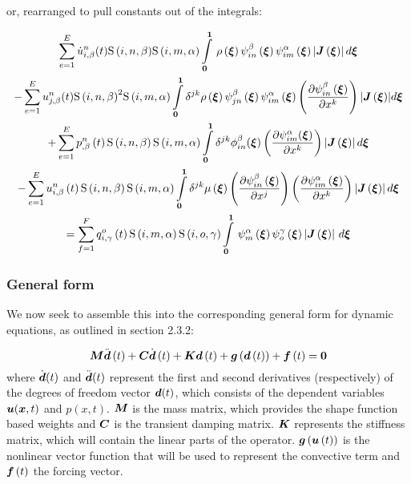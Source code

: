 or, rearranged to pull constants out of the integrals:

\begin{multline}
 \label{NSEFEM4}
  \dsum_{e=1}^{E}{\idxnodedof{\dot{u}}{i}{n}{\beta}}(t){\idxgsf{i}{n}{\beta}}{\idxgsf{i}{m}{\alpha}}
  \gint{\vectr{0}}{\vectr{1}}{\fnof{\rho}{\vectr{\xi}}{\idxgbfn{i}{n}{\beta}{\vectr{\xi}}\idxgbfn{i}{m}{\alpha}{\vectr{\xi}}
  \abs{\fnof{\matr{J}}{\vectr{\xi}}}}}{\vectr{\xi}}\\
  -\dsum_{e=1}^{E}{\idxnodedof{u}{j}{n}{\beta}}(t){\idxgsf{i}{n}{\beta}}^2{\idxgsf{i}{m}{\alpha}}
   \dintl{\vectr{0}}{\vectr{1}}\delta^{jk}{\fnof{\rho}{\vectr{\xi}}\idxgbfn{j}{n}{\beta}{\vectr{\xi}}
   \idxgbfn{i}{m}{\alpha}{\vectr{\xi}}
     \pbrac{\delby{\idxgbfn{i}{n}{\beta}{\vectr{\xi}}}{x^{k}}}
  \abs{\fnof{\matr{J}}{\vectr{\xi}}}}d{\vectr{\xi}}\\
    +\dsum_{e=1}^{E}{\fnof{\idxnodedof{p}{}{n}{\beta}}{t}\idxgsf{i}{n}{\beta}\idxgsf{i}{m}{\alpha}}
    \dintl{\vectr{0}}{\vectr{1}}\delta^{jk}\phi_{in}^{\beta}({\vectr{\xi}})
    \pbrac{\delby{\psi_{im}^{\alpha}({\vectr{\xi}})}{x^{k}}}\abs{\fnof{\matr{J}}{\vectr{\xi}}}d\vectr{\xi}\\
    -\dsum_{e=1}^{E}\fnof{\idxnodedof{u}{i}{n}{\beta}}{t}\idxgsf{i}{n}{\beta}\idxgsf{i}{m}{\alpha}
    \dintl{\vectr{0}}{\vectr{1}}{\delta^{jk}\fnof{\mu}{\vectr{\xi}}}\pbrac{\delby{\idxgbfn{i}{n}{\beta}{\vectr{\xi}}}{x^{j}}}
      \pbrac{\delby{\idxgbfn{i}{m}{\alpha}{\vectr{\xi}}}{x^{k}}}
      \abs{\fnof{\matr{J}}{\vectr{\xi}}}d{\vectr{\xi}}\\
  =\dsum_{f=1}^{F}\fnof{\idxnodedof{q}{i}{o}{\gamma}}{t}\idxgsf{i}{m}{\alpha}\idxgsf{i}{o}{\gamma}
   \gint{\vectr{0}}{\vectr{1}}{\gbfn{m}{\alpha}{\vectr{\xi}}\gbfn{o}{\gamma}{\vectr{\xi}}
    \abs{\fnof{\matr{J}}{\vectr{\xi}}}}{\vectr{\xi}}
\end{multline}


\subsubsection{General form}

We now seek to assemble this into the corresponding general form for dynamic equations, as outlined in section 2.3.2:

\begin{equation}
  \matr{M}\fnof{\ddot{\vectr{d}}}{t}+\matr{C}\fnof{\dot{\vectr{d}}}{t}+\matr{K}\fnof{\vectr{d}}{t}+
  \fnof{\vectr{g}}{\fnof{\vectr{d}}{t}}+\fnof{\vectr{f}}{t}=\vectr{0}
  \label{eqn:NSEGeneralDynamic}
\end{equation}
where $\dot{\boldsymbol{d}}(t)$ and $\ddot{\boldsymbol{d}}(t)$ represent the first and second derivatives (respectively) of the degrees of freedom vector $\boldsymbol{d}(t)$, which consists of the dependent variables $\boldsymbol{u}(\boldsymbol{x},t)$ and $p(x,t)$. $\matr{M}$ is the mass matrix, which provides the shape function based weights and $\matr{C}$ is the transient damping matrix. $\matr{K}$ represents the stiffness matrix, which will contain the linear parts of the operator. $ \boldsymbol{g}\left(  \boldsymbol{u}\left( t \right)  \right) $ is the nonlinear vector function that will be used to represent the convective term and $ \boldsymbol{f}\left( t \right) $ the forcing vector.

